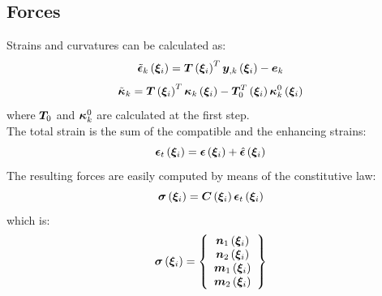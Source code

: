 \subsection{Forces}
Strains and curvatures can be calculated as:
\begin{equation}
\tilde{\T{\epsilon}}_k \valxii  =
\TT{T} \valxii ^T \T{y}_{,k} \valxii - \T{e}_k
\end{equation}
\begin{equation}
\tilde{\T{\kappa}}_k  =
\TT{T} \valxii ^ T \T{\kappa}_k \valxii - \TT{T}_0 ^ T \valxii \T{\kappa}^{0}_k \valxii
\end{equation}
where $\TT{T}_0$ and $\T{\kappa}^{0}_k$ are calculated at the first step.\\
The total strain is the sum of the compatible and the enhancing strains:
\begin{equation}
\T{\epsilon}_t \valxii =
\T{\epsilon} \valxii +
\hat{ \T{\epsilon} } \valxii
\end{equation}
The resulting forces are easily computed by means of the constitutive law:
\begin{equation}
\T{\sigma} \valxii =
\TT{C}\valxii \T{\epsilon}_t \valxii
\end{equation}
which is:
\begin{equation}
\T{\sigma} \valxii =
\cubr{\vvect{c}{
\T{n}_1 \valxii \\
\T{n}_2 \valxii \\
\T{m}_1 \valxii \\
\T{m}_2 \valxii
}}
\end{equation}
